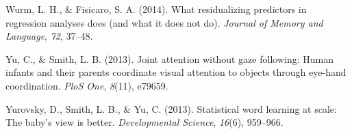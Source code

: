 \documentclass[10pt, letterpaper]{article}
\newenvironment{CSLReferences}%
  {}%
  {\par}
\begin{document}
\begin{CSLReferences}
\leavevmode\hypertarget{ref-wurm2014residualizing}{}%
Wurm, L. H., \& Fisicaro, S. A. (2014). What residualizing predictors in
regression analyses does (and what it does not do). \emph{Journal of
Memory and Language}, \emph{72}, 37--48.

\leavevmode\hypertarget{ref-yu2013joint}{}%
Yu, C., \& Smith, L. B. (2013). Joint attention without gaze following:
Human infants and their parents coordinate visual attention to objects
through eye-hand coordination. \emph{PloS One}, \emph{8}(11), e79659.

\leavevmode\hypertarget{ref-yurovsky2013statistical}{}%
Yurovsky, D., Smith, L. B., \& Yu, C. (2013). Statistical word learning
at scale: The baby's view is better. \emph{Developmental Science},
\emph{16}(6), 959--966.

\end{CSLReferences}


\end{document}
